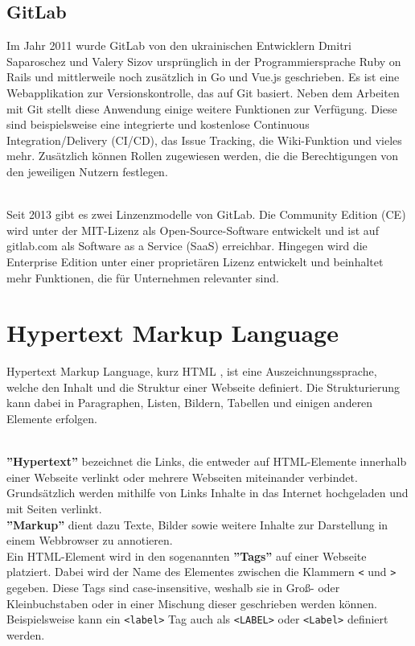 \subsection{GitLab}
Im Jahr 2011 wurde GitLab \cite{gitlab_2020} von den ukrainischen Entwicklern Dmitri Saparoschez und Valery Sizov ursprünglich in der Programmiersprache Ruby on Rails und mittlerweile noch zusätzlich in Go und Vue.js geschrieben. Es ist eine Webapplikation zur Versionskontrolle, das auf Git basiert. Neben dem Arbeiten mit Git stellt diese Anwendung einige weitere Funktionen zur Verfügung. Diese sind beispielsweise eine integrierte und kostenlose Continuous Integration/Delivery (CI/CD), das Issue Tracking, die Wiki-Funktion und vieles mehr. Zusätzlich können Rollen zugewiesen werden, die die Berechtigungen von den jeweiligen Nutzern festlegen.

\mbox{}\\Seit 2013 gibt es zwei Linzenzmodelle von GitLab. Die Community Edition (CE) wird unter der MIT-Lizenz als Open-Source-Software entwickelt und ist auf gitlab.com als Software as a Service (SaaS) erreichbar. Hingegen wird die Enterprise Edition unter einer proprietären Lizenz entwickelt und beinhaltet mehr Funktionen, die für Unternehmen relevanter sind.

\section{Hypertext Markup Language}
Hypertext Markup Language, kurz HTML \cite{html_2021}, ist eine Auszeichnungssprache, welche den Inhalt und die Struktur einer Webseite definiert. Die Strukturierung kann dabei in Paragraphen, Listen, Bildern, Tabellen und einigen anderen Elemente erfolgen. 

\mbox{}\\
\textbf{''Hypertext''} bezeichnet die Links, die entweder auf HTML-Elemente innerhalb einer Webseite verlinkt oder mehrere Webseiten miteinander verbindet. Grundsätzlich werden mithilfe von Links Inhalte in das Internet hochgeladen und mit Seiten verlinkt.\\
\textbf{''Markup''} dient dazu Texte, Bilder sowie weitere Inhalte zur Darstellung in einem Webbrowser zu annotieren.\\
Ein HTML-Element wird in den sogenannten \textbf{''Tags''} auf einer Webseite platziert. Dabei wird der Name des Elementes zwischen die Klammern \texttt{<} und \texttt{>} gegeben. Diese Tags sind case-insensitive, weshalb sie in Groß- oder Kleinbuchstaben oder in einer Mischung dieser geschrieben werden können. Beispielsweise kann ein \texttt{<label>} Tag auch als \texttt{<LABEL>} oder \texttt{<Label>} definiert werden.

